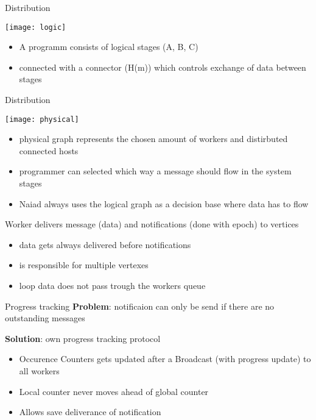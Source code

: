 \begin{frame}[t]{Distribution}
  \vspace{0.6cm}
  \begin{center}
    \texttt{[image: logic]}
  \end{center}
  \begin{itemize}
  \item A programm consists of logical stages (A, B, C)
  \item connected with a connector (H(m)) which controls exchange of data between stages
  \end{itemize}
\end{frame}

\begin{frame}[t]{Distribution}
  \vspace{0.15cm}
   \begin{center}
   \texttt{[image: physical]}
   \end{center}
   \begin{itemize}
     \item physical graph represents the chosen amount of workers and distirbuted connected hosts
     \item programmer can selected which way a message should flow in the system
stages
\item Naiad always uses the logical graph as a decision base where data has to flow
    \end{itemize}

\end{frame}

\begin{frame}[t]{Worker}
  \vspace{0.15cm}
delivers message (data) and notifications (done with epoch) to vertices

   \begin{itemize}
     \item data gets always delivered before notifications
     \item is responsible for multiple vertexes
	 \item loop data does not pass trough the workers queue
   \end{itemize}

\end{frame}

\begin{frame}[t]{Progress tracking}
  \vspace{0.15cm}
\textbf{Problem}: notificaion can only be send if there are no outstanding messages

\textbf{Solution}: own progress tracking protocol
   \begin{itemize}
     \item Occurence Counters gets updated after a Broadcast (with progress update) to all workers
     \item Local counter never moves ahead of global counter
	 \item Allows save deliverance of notification
   \end{itemize}

\end{frame}

